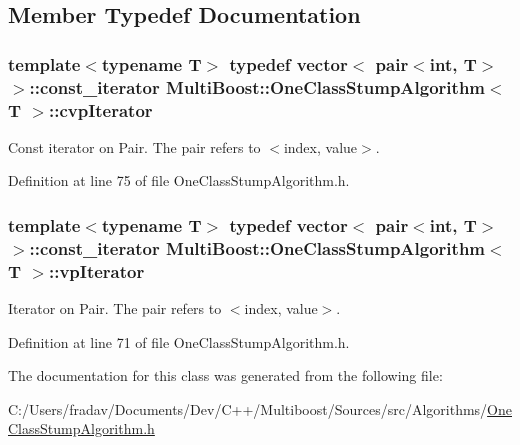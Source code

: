 \subsection{Member Typedef Documentation}
\hypertarget{classMultiBoost_1_1OneClassStumpAlgorithm_a814d7366f9bcbcfd50a04ea0102ac6d9}{
\subsubsection[{cvp\-Iterator}]{\setlength{\rightskip}{0pt plus 5cm}template$<$typename T$>$ typedef vector$<$ pair$<$int, T$>$ $>$\-::const\-\_\-iterator {\bf Multi\-Boost\-::\-One\-Class\-Stump\-Algorithm}$<$ T $>$\-::{\bf cvp\-Iterator}}}\label{classMultiBoost_1_1OneClassStumpAlgorithm_a814d7366f9bcbcfd50a04ea0102ac6d9}
Const iterator on Pair. The pair refers to $<$index, value$>$. 

Definition at line 75 of file One\-Class\-Stump\-Algorithm.\-h.

\hypertarget{classMultiBoost_1_1OneClassStumpAlgorithm_a5ad69d710488cdd1aa350baf36c13384}{
\subsubsection[{vp\-Iterator}]{\setlength{\rightskip}{0pt plus 5cm}template$<$typename T$>$ typedef vector$<$ pair$<$int, T$>$ $>$\-::const\-\_\-iterator {\bf Multi\-Boost\-::\-One\-Class\-Stump\-Algorithm}$<$ T $>$\-::{\bf vp\-Iterator}}}\label{classMultiBoost_1_1OneClassStumpAlgorithm_a5ad69d710488cdd1aa350baf36c13384}
Iterator on Pair. The pair refers to $<$index, value$>$. 

Definition at line 71 of file One\-Class\-Stump\-Algorithm.\-h.



The documentation for this class was generated from the following file\-:\begin{DoxyCompactItemize}
\item 
C\-:/\-Users/fradav/\-Documents/\-Dev/\-C++/\-Multiboost/\-Sources/src/\-Algorithms/\hyperlink{OneClassStumpAlgorithm_8h}{One\-Class\-Stump\-Algorithm.\-h}\end{DoxyCompactItemize}
